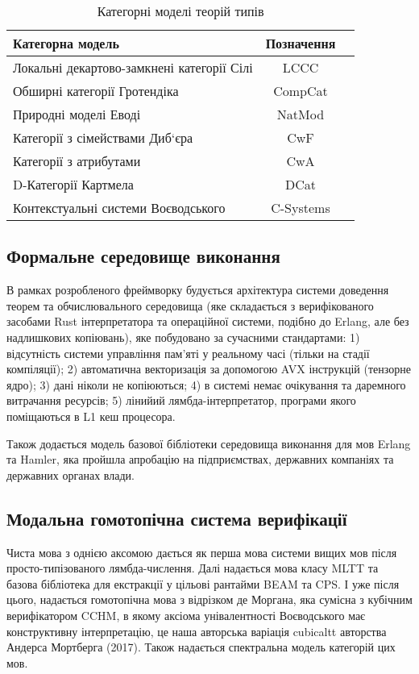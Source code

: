 \begin{table}[ht]
 \caption{Категорні моделі теорій типів}
  \begin{tabular}{lcc}
    \hline
       \textbf{Категорна модель} & \textbf{Позначення} \\
    \hline
 Локальні декартово-замкнені категорії Сілі & LCCC \\
 Обширні категорії Гротендіка               & CompCat \\
 Природні моделі Еводі                      & NatMod \\
 Категорії з сімействами Диб`єра            & CwF \\
 Категорії з атрибутами                     & CwA \\
 D-Категорії Картмела                       & DCat \\
 Контекстуальні системи Воєводського        & C-Systems \\
    \hline
  \end{tabular}
\end{table}


\subsection{Формальне середовище виконання}
В рамках розробленого фреймворку будується
архітектура системи доведення теорем та обчислювального
середовища (яке складається з верифікованого засобами Rust
інтерпретатора та операційної системи, подібно до Erlang, але без надлишкових копіювань),
яке побудовано за сучасними стандартами:
1) відсутність системи управління пам'яті у реальному часі (тільки на стадії компіляції);
2) автоматична векторизація за допомогою AVX інструкцій (тензорне ядро);
3) дані ніколи не копіюються;
4) в системі немає очікування та даремного витрачання ресурсів;
5) лінийий лямбда-інтерпретатор, програми якого поміщаються в L1 кеш процесора.

Також додається модель базової бібліотеки середовища виконання для мов Erlang та Hamler,
яка пройшла апробацію на підприємствах, державних компаніях та державних органах влади.

\subsection{Модальна гомотопічна система верифікації}
Чиста мова з однією аксомою дається як перша мова системи вищих мов після просто-типізованого лямбда-числення.
Далі надається мова класу MLTT та базова бібліотека для екстракції у цільові рантайми BEAM та CPS.
І уже після цього, надається гомотопічна мова з відрізком де Моргана, яка сумісна з кубічним верифікатором CCHM,
в якому аксіома унівалентності Воєводського має конструктивну інтерпретацію,
це наша авторська варіація cubicaltt авторства Андерса Мортберга (2017).
Також надається спектральна модель категорій цих мов.

